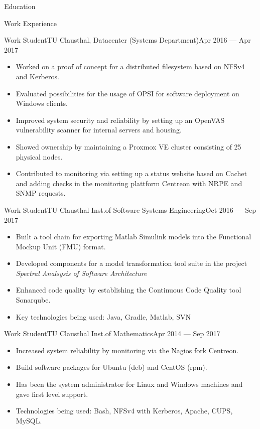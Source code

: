 \documentclass[]{mcdowellcv}
\begin{document}
\begin{cvsection}{Education}
\begin{cvsection}{Work Experience}
\begin{cvsubsection}{Work Student}{TU Clausthal, Datacenter (Systems Department)}{Apr 2016 --- Apr 2017}
\bigskip
\begin{itemize}
\item Worked on a proof of concept for a distributed filesystem based on NFSv4 and Kerberos.
\item Evaluated possibilities for the usage of OPSI for software deployment on Windows clients.
\item Improved system security and reliability by setting up an OpenVAS vulnerability scanner for internal servers and housing.
\item Showed ownership by maintaining a Proxmox VE cluster consisting of 25 physical nodes.
\item Contributed to monitoring via setting up a status website based on Cachet and adding checks in the monitoring plattform Centreon with NRPE and SNMP requests.
\end{itemize}
\end{cvsubsection}

\begin{cvsubsection}{Work Student}{TU Clausthal Inst.\@ of Software Systems Engineering}{Oct 2016 --- Sep 2017}
\bigskip
\begin{itemize}
\item Built a tool chain for exporting Matlab Simulink models into the Functional Mockup Unit (FMU) format.
\item Developed components for a model transformation tool suite in the project \emph{Spectral Analsysis of Software Architecture}
\item Enhanced code quality by establishing the Continuous Code Quality tool Sonarqube.
\item Key technologies being used: Java, Gradle, Matlab, SVN
\end{itemize}
\end{cvsubsection}

\begin{cvsubsection}{Work Student}{TU Clausthal Inst.\@ of Mathematics}{Apr 2014 --- Sep 2017}
\bigskip
\begin{itemize}
\item Increased system reliability by monitoring via the Nagios fork Centreon.
\item Build software packages for Ubuntu (deb) and CentOS (rpm).
\item Has been the system administrator for Linux and Windows machines and gave first level support.
\item Technologies being used: Bash, NFSv4 with Kerberos, Apache, CUPS, MySQL\@.
\end{itemize}
\end{cvsubsection}
\end{cvsection}


\end{cvsection}
\end{document}
